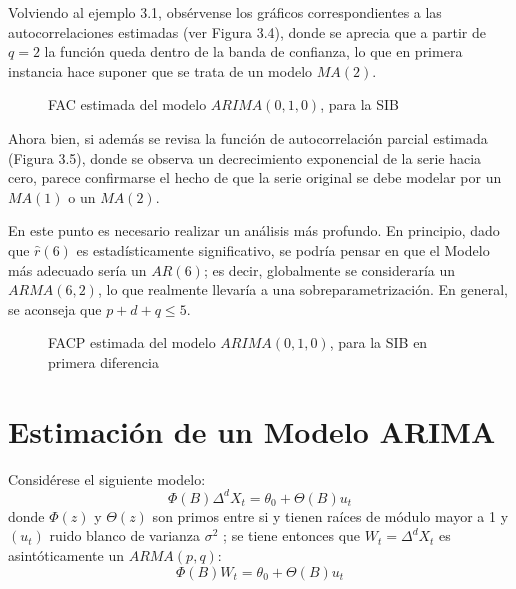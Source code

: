 \begin{ejemplo}
Volviendo al ejemplo 3.1, obs\'{e}rvense los 
gr\'{a}ficos correspondientes a las autocorrelaciones estimadas (ver Figura 
3.4), donde se aprecia que a partir de $q=2$ la funci\'{o}n queda dentro de 
la banda de confianza, lo que en primera instancia hace suponer que se trata 
de un modelo $MA(2).$

\begin{figure}[H]
\centering
\caption{FAC estimada del modelo $ARIMA(0,1,0)$, para la SIB}
\end{figure}

Ahora bien, si adem\'{a}s se revisa la funci\'{o}n de autocorrelaci\'{o}n 
parcial estimada (Figura 3.5), donde se observa un decrecimiento exponencial 
de la serie hacia cero, parece confirmarse el hecho de que la serie original 
se debe modelar por un $MA(1)$ o un $MA(2)$.

En este punto es necesario realizar un an\'{a}lisis m\'{a}s profundo. En 
principio, dado que $\widehat{r}(6)$ es estad\'{i}sticamente significativo, se 
podr\'{i}a pensar en que el Modelo m\'{a}s adecuado ser\'{i}a un $AR(6)$; 
es decir, globalmente se considerar\'{i}a un $ARMA(6,2)$, lo que realmente 
llevar\'{i}a a una sobreparametrizaci\'{o}n. En general, se aconseja que 
$p+d+q\le 5$.

\begin{figure}[H]
\centering
\caption{FACP estimada del modelo $ARIMA(0,1,0)$, para la SIB en primera 
diferencia}
\end{figure}
\end{ejemplo}



\section{Estimaci\'{o}n de un Modelo ARIMA}

Consid\'{e}rese el siguiente modelo:
\[
 \Phi(B)\Delta^{d} X_{t}=  \theta_0  +  \Theta(B) u_{t}
\]
donde $\Phi(z)$ y $\Theta(z)$ son primos entre si y tienen ra\'{i}ces de 
m\'{o}dulo mayor a 1 y $(u_{t})$ ruido blanco de varianza $\sigma 
^{2}$ ; se tiene entonces que $W_{t} = \Delta^{d} X_{t}$ es asint\'{o}ticamente un $ARMA (p,q)$:
\[
 \Phi(B) W_{t} = \theta_{0} +  \Theta (B) u_{t}
\]


